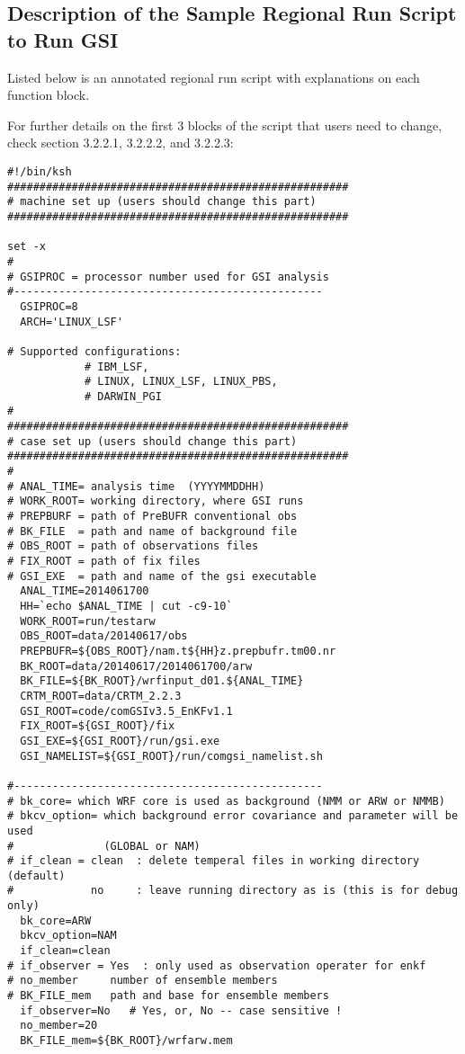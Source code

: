 \subsection{Description of the Sample Regional Run Script to Run GSI}
\label{sec3.2.3}

Listed below is an annotated regional run script with explanations on each function block.

For further details on the first 3 blocks of the script that users need to change, check section 3.2.2.1, 3.2.2.2, and 3.2.2.3: 

\begin{footnotesize}
\begin{verbatim}
#!/bin/ksh
#####################################################
# machine set up (users should change this part)
#####################################################

set -x
#
# GSIPROC = processor number used for GSI analysis
#------------------------------------------------
  GSIPROC=8
  ARCH='LINUX_LSF'

# Supported configurations:
            # IBM_LSF,
            # LINUX, LINUX_LSF, LINUX_PBS,
            # DARWIN_PGI
#
#####################################################
# case set up (users should change this part)
#####################################################
#
# ANAL_TIME= analysis time  (YYYYMMDDHH)
# WORK_ROOT= working directory, where GSI runs
# PREPBURF = path of PreBUFR conventional obs
# BK_FILE  = path and name of background file
# OBS_ROOT = path of observations files
# FIX_ROOT = path of fix files
# GSI_EXE  = path and name of the gsi executable
  ANAL_TIME=2014061700
  HH=`echo $ANAL_TIME | cut -c9-10`
  WORK_ROOT=run/testarw
  OBS_ROOT=data/20140617/obs
  PREPBUFR=${OBS_ROOT}/nam.t${HH}z.prepbufr.tm00.nr
  BK_ROOT=data/20140617/2014061700/arw
  BK_FILE=${BK_ROOT}/wrfinput_d01.${ANAL_TIME}
  CRTM_ROOT=data/CRTM_2.2.3
  GSI_ROOT=code/comGSIv3.5_EnKFv1.1
  FIX_ROOT=${GSI_ROOT}/fix
  GSI_EXE=${GSI_ROOT}/run/gsi.exe
  GSI_NAMELIST=${GSI_ROOT}/run/comgsi_namelist.sh

#------------------------------------------------
# bk_core= which WRF core is used as background (NMM or ARW or NMMB)
# bkcv_option= which background error covariance and parameter will be used
#              (GLOBAL or NAM)
# if_clean = clean  : delete temperal files in working directory (default)
#            no     : leave running directory as is (this is for debug only)
  bk_core=ARW
  bkcv_option=NAM
  if_clean=clean
# if_observer = Yes  : only used as observation operater for enkf
# no_member     number of ensemble members
# BK_FILE_mem   path and base for ensemble members
  if_observer=No   # Yes, or, No -- case sensitive !
  no_member=20
  BK_FILE_mem=${BK_ROOT}/wrfarw.mem
\end{verbatim}
\end{footnotesize}

